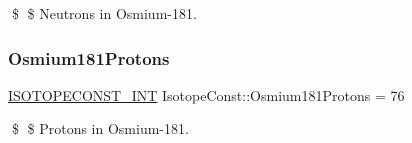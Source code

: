 \$ \$ Neutrons in Osmium-\/181. \mbox{\label{group___isotope_const-_osmium-_os181_ga124a7597112c5a2fb52936c0418d3efd}} 
\subsubsection{\texorpdfstring{Osmium181\+Protons}{Osmium181Protons}}
{\footnotesize\ttfamily \mbox{\hyperlink{group___isotope_const-_macros_ga5f18360b3e99483a35c32d789e62621c}{I\+S\+O\+T\+O\+P\+E\+C\+O\+N\+S\+T\+\_\+\+I\+NT}} Isotope\+Const\+::\+Osmium181\+Protons = 76}

\$ \$ Protons in Osmium-\/181. 